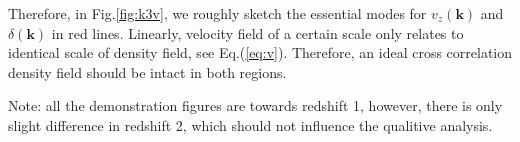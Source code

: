 Therefore, in Fig.\ref{fig:k3v}, we roughly sketch the essential modes 
for $v_z(\bm{k})$ and $\delta(\bm{k})$ 
in red lines. 
Linearly, velocity field of a certain scale only relates to 
identical scale of density field, see Eq.(\ref{eq:v}). 
Therefore, an ideal cross correlation density field should be intact in both regions. 

Note: all the demonstration figures are towards redshift 1, 
however, there is only slight difference  
in redshift 2, 
which should not influence the qualitive analysis.
